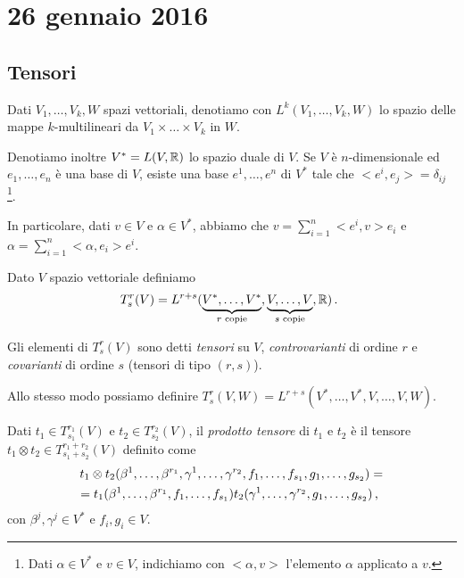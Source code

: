 \chapter{26 gennaio 2016}

\section{Tensori}
Dati $V_1,\dots,V_k,W$ spazi vettoriali, denotiamo con $L^k(V_1,\dots,V_k,W)$ lo spazio delle mappe $k$-multilineari da $V_1\times\dots\times V_k$ in $W$.

Denotiamo inoltre $V^* = L(V,\mathbb R)$ lo spazio duale di $V$.
Se $V$ è $n$-dimensionale ed $e_1,\dots,e_n$ è una base di $V$, esiste una base $e^1,\dots,e^n$ di $V^*$ tale che $<e^i,e_j> = \delta_{ij}$ \footnote{Dati $\alpha \in V^*$ e $v\in V$, indichiamo con $<\alpha, v>$ l'elemento $\alpha$ applicato a $v$.}.

In particolare, dati $v\in V$ e $\alpha \in V^*$, abbiamo che $v= \sum_{i=1}^n <e^i,v> e_i$ e $\alpha= \sum_{i=1}^n <\alpha,e_i> e^i$.

\begin{definition}
	Dato $V$ spazio vettoriale definiamo 
	\begin{equation*}
	T_s^r(V) = L^{r+s} (\underbrace{V^*,\dots,V^*}_{\text{$r$ copie}},\underbrace{V,\dots,V}_{\text{$s$ copie}},\mathbb R) \, \text{. }
	\end{equation*}
	
	Gli elementi di $T_s^r(V)$ sono detti \emph{tensori} su $V$, \emph{controvarianti} di ordine $r$ e \emph{covarianti} di ordine $s$ (tensori di tipo $(r,s)$).
\end{definition}

\begin{remark}
	Allo stesso modo possiamo definire $T_s^r(V,W) = L^{r+s} (V^*,\dots,V^*,V,\dots,V,W)$.
\end{remark}


\begin{definition}
	Dati $t_1\in T_{s_1}^{r_1}(V)$ e $t_2\in T_{s_2}^{r_2}(V)$, il \emph{prodotto tensore} di $t_1$ e $t_2$ è il tensore $t_1\otimes t_2 \in T_{s_1+s_2}^{r_1+r_2}(V)$ definito come 
	\begin{multline*}
		t_1\otimes t_2(\beta^1,\dots,\beta^{r_1},\gamma^1,\dots,\gamma^{r_2}, f_1,\dots,f_{s_1},g_1,\dots,g_{s_2}) =\\
		=t_1(\beta^1,\dots,\beta^{r_1},f_1,\dots,f_{s_1})t_2(\gamma^1,\dots,\gamma^{r_2},g_1,\dots,g_{s_2}) \, \text{, }
	\end{multline*}
	con $\beta^j,\gamma^j\in V^*$ e $f_i,g_i\in V$.
\end{definition}

